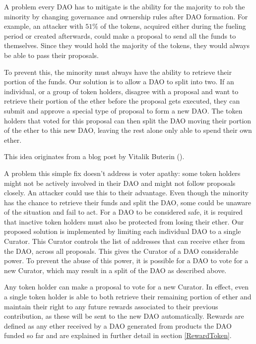 \documentclass[9pt,oneside]{amsart}
\begin{document}
\begin{multicols}{2}
A problem every DAO has to mitigate is the ability for the majority to rob the minority by changing governance and ownership rules after DAO formation. For example, an attacker with $51\%$ of the tokens, acquired either during the fueling period or created afterwards, could make a proposal to send all the funds to themselves. Since they would hold the majority of the tokens, they would always be able to pass their proposals.

To prevent this, the minority must always have the ability to retrieve their portion of the funds. Our solution is to allow a DAO to split into two. If an individual, or a group of token holders, disagree with a proposal and want to retrieve their portion of the ether before the proposal gets executed, they can submit and approve a special type of proposal to form a new DAO. The token holders that voted for this proposal can then split the DAO moving their portion of the ether to this new DAO, leaving the rest alone only able to spend their own ether.

This idea originates from a blog post by Vitalik Buterin (\cite{Vitalik2015subjectivity}). 

A problem this simple fix doesn't address is voter apathy: some token holders might not be actively involved in their DAO and might not follow proposals closely.
An attacker could use this to their advantage. Even though the minority has the chance to retrieve their funds and split the DAO, some could be unaware of the situation and fail to act.
For a DAO to be considered safe, it is required that inactive token holders must also be protected from losing their ether. Our proposed solution is implemented by limiting each individual DAO to a single Curator.
This Curator controls the list of addresses that can receive ether from the DAO, across all proposals.
This gives the Curator of a DAO considerable power. To prevent the abuse of this power, it is possible for a DAO to vote for a new Curator, which may result in a split of the DAO as described above. 

Any token holder can make a proposal to vote for a new Curator. In effect, even a single token holder is able to both retrieve their remaining portion of ether and maintain their right to any future rewards associated to their previous contribution, as these will be sent to the new DAO automatically. Rewards are defined as any ether received by a DAO generated from products the DAO funded so far and are explained in further detail in section \ref{RewardToken}.


\end{multicols}
\end{document}
